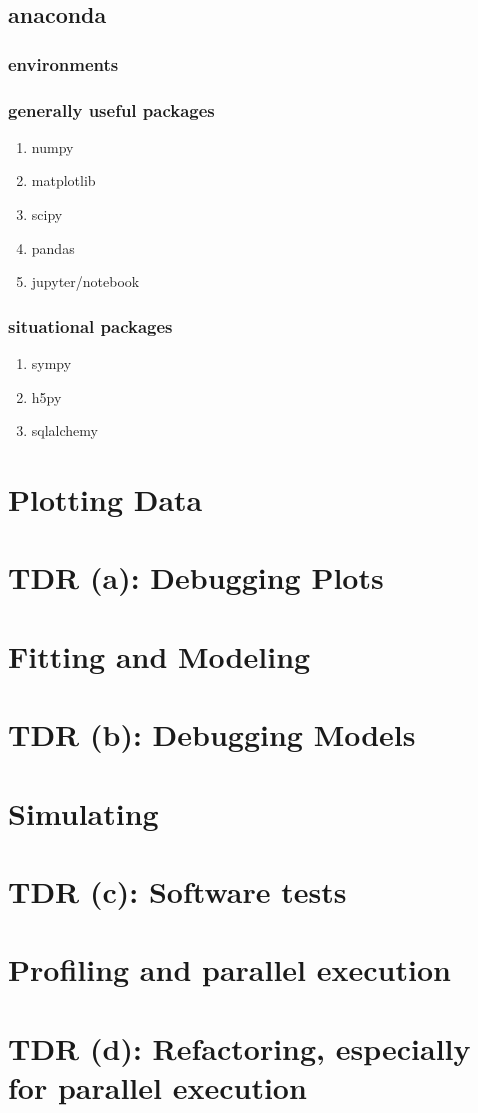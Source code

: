 \documentclass{tufte-handout}
\begin{document}
\subsection{anaconda}
\label{sec-2-7}
\subsubsection{environments}
\label{sec-2-7-1}
\subsubsection{generally useful packages}
\label{sec-2-7-2}
\begin{enumerate}
\item numpy
\label{sec-2-7-2-1}
\item matplotlib
\label{sec-2-7-2-2}
\item scipy
\label{sec-2-7-2-3}
\item pandas
\label{sec-2-7-2-4}
\item jupyter/notebook
\label{sec-2-7-2-5}
\end{enumerate}
\subsubsection{situational packages}
\label{sec-2-7-3}
\begin{enumerate}
\item sympy
\label{sec-2-7-3-1}
\item h5py
\label{sec-2-7-3-2}
\item sqlalchemy
\label{sec-2-7-3-3}
\end{enumerate}
\section{Plotting Data}
\label{sec-3}
\section{TDR (a): Debugging Plots}
\label{sec-4}
\section{Fitting and Modeling}
\label{sec-5}
\section{TDR (b): Debugging Models}
\label{sec-6}
\section{Simulating}
\label{sec-7}
\section{TDR (c): Software tests}
\label{sec-8}
\section{Profiling and parallel execution}
\label{sec-9}
\section{TDR (d): Refactoring, especially for parallel execution}
\label{sec-10}
\end{document}

